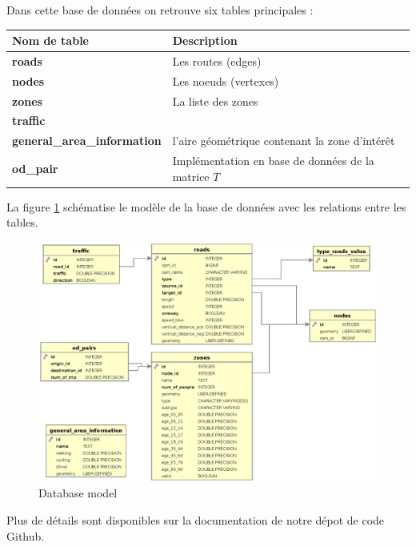 Dans cette base de données on retrouve six tables principales :
\begin{tabular}{|l|l|}
  \hline
  Nom de table & Description \\
  \hline
  \hline
  \textbf{roads} & Les routes (edges)\\
  \textbf{nodes} & Les noeuds (vertexes)\\
  \textbf{zones} & La liste des zones\\ 
  \textbf{traffic} & \\
  \textbf{general\_area\_information} & l'aire géométrique contenant la zone d'intérêt\\
  \textbf{od\_pair} & Implémentation en base de données de la matrice $T$ \\
  \hline
\end{tabular}



La figure \ref{img.schema} schématise le modèle de la base de données avec les relations entre les tables.

\begin{figure}
  \centering
  \includegraphics[width=15cm]{img/c01-transp-model/db.eps}
  \caption{Database model}
  \label{img.schema}
\end{figure}


Plus de détails sont disponibles sur la documentation de notre dépot de code Github.

